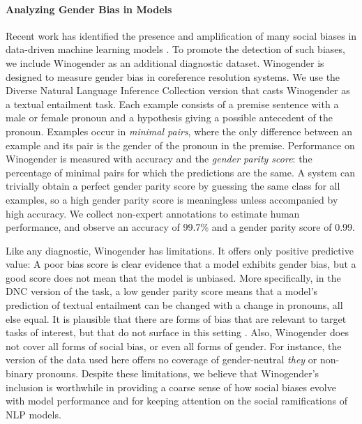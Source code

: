 \paragraph{Analyzing Gender Bias in Models}
Recent work has identified the presence and amplification of many social biases in data-driven machine learning models
\citep[][ i.a.]{lu-2018-gender, zhao-2018-gender}. To promote the detection of such biases, we include Winogender \citep{rudinger-winogender} as an additional diagnostic dataset. Winogender is designed to measure gender bias in coreference resolution systems. We use the Diverse Natural Language Inference Collection \citep{poliak-2018-dnc} version that casts Winogender as a textual entailment task.%
Each example consists of a premise sentence with a male or female pronoun and a hypothesis giving a possible antecedent of the pronoun.
Examples occur in \textit{minimal pairs}, where the only difference between an example and its pair is the gender of the pronoun in the premise.
Performance on Winogender is measured with accuracy and the \textit{gender parity score}: the percentage of minimal pairs for which the predictions are the same.
A system can trivially obtain a perfect gender parity score by guessing the same class for all examples, so a high gender parity score is meaningless unless accompanied by high accuracy.
We collect non-expert annotations to estimate human performance, and observe an accuracy of 99.7\% and a gender parity score of 0.99.

Like any diagnostic, Winogender has limitations. It offers only positive predictive value: A poor bias score is clear evidence that a model exhibits gender bias, but a good score does not mean that the model is unbiased. More specifically, in the DNC version of the task, a low gender parity score means that a model's prediction of textual entailment can be changed with a change in pronouns, all else equal. It is plausible that there are forms of bias that are relevant to target tasks of interest, but that do not surface in this setting \citep{gonen-goldberg-2019-lipstick}. 
Also, Winogender does not cover all forms of social bias, or even all forms of gender. For instance, the version of the data used here offers no coverage of gender-neutral \textit{they} or non-binary pronouns. Despite these limitations, we believe that Winogender's inclusion is worthwhile in providing a coarse sense of how social biases evolve with model performance and for keeping attention on the social ramifications of NLP models.

